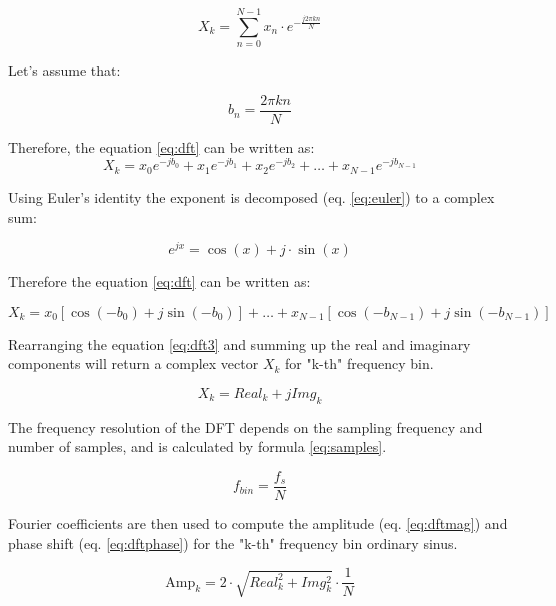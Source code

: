 \begin{equation} \label{eq:dft}
X_k = \sum_{n=0}^{N-1} x_n \cdot e^{-\frac{j2 \pi kn}{N}}
\end{equation}

Let's assume that:

\begin{equation} \label{eq:bn}
b_n = \frac{2 \pi k n}{N}
\end{equation}

Therefore, the equation \ref{eq:dft} can be written as:
\begin{equation} \label{eq:dft2}
X_k = x_{0} e^{-j b_{0}} + x_{1} e^{-j b_{1}} + x_{2} e^{-j b_{2}} + \ldots + x_{N-1} e^{-j b_{N-1}}
\end{equation}

Using Euler's identity the exponent is decomposed (eq. \ref{eq:euler}) to a complex sum:

\begin{equation} \label{eq:euler}
e^{jx} = \cos(x) + j \cdot \sin(x)
\end{equation}

Therefore the equation \ref{eq:dft} can be written as:

\begin{equation} \label{eq:dft3}
X_k = x_0 [\cos(-b_{0}) + j \sin(-b_{0})] +  \ldots + x_{N-1} [\cos(-b_{N-1}) + j \sin(-b_{N-1})]
\end{equation}

Rearranging the equation \ref{eq:dft3} and summing up the real and imaginary components will return a complex vector $X_k$ for "k-th" frequency bin.

\begin{equation} \label{eq:complex}
X_k = Real_k + j Img_{k}
\end{equation}
 
The frequency resolution of the DFT depends on the sampling frequency and number of samples, and is calculated by formula \ref{eq:samples}. 

\begin{equation} \label{eq:samples}
f_{bin} = \frac{f_{s}}{N}
\end{equation}

Fourier coefficients are then used to compute the amplitude (eq. \ref{eq:dftmag}) and phase shift (eq. \ref{eq:dftphase}) for the "k-th" frequency bin ordinary sinus.

\begin{equation} \label{eq:dftmag}
\text{Amp}_k = 2 \cdot \sqrt{Real_{k}^{2} + Img_{k}^{2}} \cdot \frac{1}{N}
\end{equation}

